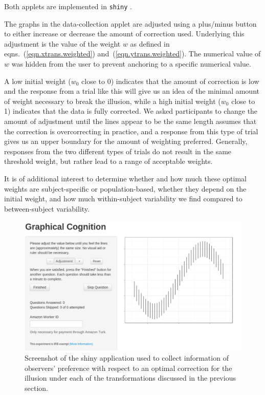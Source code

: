 \documentclass[11pt]{isuthesis}\usepackage[]{graphicx}\usepackage[]{color}
\begin{document}
Both applets are implemented in {\tt shiny} \citep{shiny}. 

The graphs in the data-collection applet are adjusted using a plus/minus button to either increase or decrease the amount of correction used. Underlying this adjustment is the value of the weight $w$ as defined in eqns.~(\ref{eqn.xtrans.weighted}) and~(\ref{eqn.ytrans.weighted}). The numerical value of $w$ was hidden from the user to prevent anchoring to a specific numerical value.

A low  initial weight ($w_0$ close to 0) indicates that the amount of correction is low and the response from a trial like this will give us an idea of the minimal amount of weight necessary to break the illusion, while a high initial weight ($w_0$ close to 1) indicates that the data is fully corrected. We asked participants to change the amount of adjustment until the lines appear to be the same length assumes that the correction is overcorrecting in practice, and a response from this type of trial gives us an upper boundary for the amount of weighting preferred. Generally, responses from the two different types of trials do not result in the same threshold weight, but rather lead to a range of acceptable weights.

It is of additional interest to determine whether and how much these optimal weights are subject-specific or population-based, whether they depend on the initial weight, and how much within-subject variability we find compared to between-subject variability. 

\begin{figure}\centering
\includegraphics[width=.92\textwidth]{shiny}
\caption[Screenshot of Data Collection Website]{\label{fig:shiny.app} Screenshot of the shiny application used to collect information of observers' preference with respect to an optimal correction for the illusion under each of the  transformations discussed in the previous section. }
\end{figure}
\end{document}
